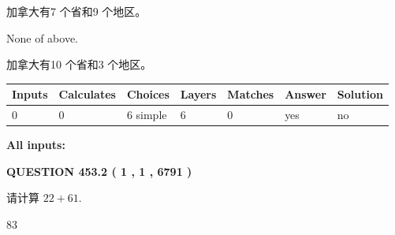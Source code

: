 \documentclass{ctexart}
\begin{document}
 
加拿大有7 个省和9 个地区。
 
 
 None of above.
 
 
\noindent{}
 
 
加拿大有10 个省和3 个地区。
 
 
\noindent{}
 
 
   
   
   
   
\noindent\begin{tabular}{|l|l|l|l|l|l|l|}
 \hline
Inputs & Calculates & Choices & Layers & Matches & Answer & Solution \\ \hline
 0  & 
 0  & 
 6
  simple  
  & 
 6  & 
 0  & 
  yes & 
  no 
  \\ \hline
 \end{tabular}
   
   
   
   
\noindent{}
   
   
   
   
\noindent\vspace{0.1in}\hspace{-0.08in} {\textbf{\Large{All inputs: }}}
   
   
  
\vspace{0.2in}
  
{\textbf{\Large{QUESTION
453.2 
 ( 1 , 1 , 6791 )
}}}
  
  
 
请计算 $ %
22 +  %
61 $.
 
 
 
\noindent{}
 
 

83
 
 
\noindent{}
 
 

 
 
 
\noindent{}
 
 
\end{document}
